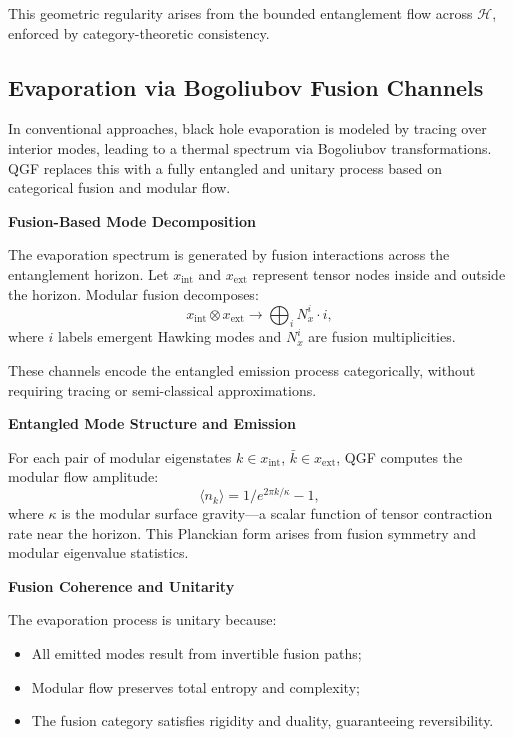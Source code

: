 \documentclass[11pt]{article}
\def\frac#1#2{#1/#2}
\begin{document}
This geometric regularity arises from the bounded entanglement flow across \( \mathcal{H} \), enforced by category-theoretic consistency.



\subsection{Evaporation via Bogoliubov Fusion Channels}

In conventional approaches, black hole evaporation is modeled by tracing over interior modes, leading to a thermal spectrum via Bogoliubov transformations. QGF replaces this with a fully entangled and unitary process based on categorical fusion and modular flow.

\vspace{0.5em}
\noindent\textbf{Fusion-Based Mode Decomposition}

The evaporation spectrum is generated by fusion interactions across the entanglement horizon. Let \( x_{\text{int}} \) and \( x_{\text{ext}} \) represent tensor nodes inside and outside the horizon. Modular fusion decomposes:
\[
x_{\text{int}} \otimes x_{\text{ext}} \rightarrow \bigoplus_{i} N_{x}^{i} \cdot i,
\]
where \( i \) labels emergent Hawking modes and \( N_{x}^{i} \) are fusion multiplicities.

These channels encode the entangled emission process categorically, without requiring tracing or semi-classical approximations.

\vspace{0.5em}
\noindent\textbf{Entangled Mode Structure and Emission}

For each pair of modular eigenstates \( k \in x_{\text{int}} \), \( \bar{k} \in x_{\text{ext}} \), QGF computes the modular flow amplitude:
\[
\langle n_k \rangle = \frac{1}{e^{2\pi k/\kappa} - 1},
\]
where \( \kappa \) is the modular surface gravity—a scalar function of tensor contraction rate near the horizon. This Planckian form arises from fusion symmetry and modular eigenvalue statistics.

\vspace{0.5em}
\noindent\textbf{Fusion Coherence and Unitarity}

The evaporation process is unitary because:
\begin{itemize}
  \item All emitted modes result from invertible fusion paths;
  \item Modular flow preserves total entropy and complexity;
  \item The fusion category satisfies rigidity and duality, guaranteeing reversibility.
\end{itemize}
\end{document}
